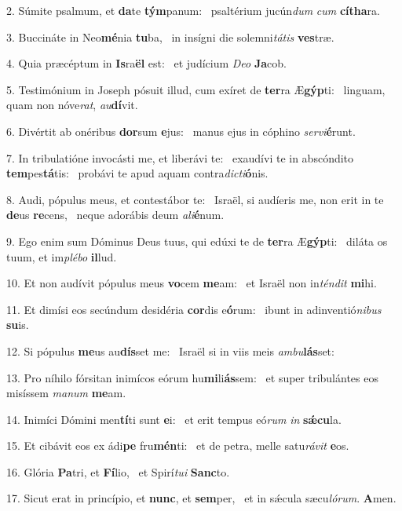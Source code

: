 2. Súmite psalmum, et \textbf{da}te \textbf{tým}panum: \ast\  psaltérium jucún\textit{dum} \textit{cum} \textbf{cí}\textbf{tha}ra.\

3. Buccináte in Neo\textbf{mé}nia \textbf{tu}ba, \ast\  in insígni die solemni\textit{tá}\textit{tis} \textbf{ves}træ.\

4. Quia præcéptum in \textbf{Is}ra\textbf{ël} est: \ast\  et judícium \textit{De}\textit{o} \textbf{Ja}cob.\

5. Testimónium in Joseph pósuit illud, cum exíret de \textbf{ter}ra Æ\textbf{gýp}ti: \ast\  linguam, quam non nóve\textit{rat}, \textit{au}\textbf{dí}vit.\

6. Divértit ab onéribus \textbf{dor}sum \textbf{e}jus: \ast\  manus ejus in cóphino \textit{ser}\textit{vi}\textbf{é}runt.\

7. In tribulatióne invocásti me, et liberávi te: \dag\  exaudívi te in abscóndito \textbf{tem}pes\textbf{tá}tis: \ast\  probávi te apud aquam contra\textit{dic}\textit{ti}\textbf{ó}nis.\

8. Audi, pópulus meus, et contestábor te: \dag\  Israël, si audíeris me, non erit in te \textbf{de}us \textbf{re}cens, \ast\  neque adorábis deum \textit{a}\textit{li}\textbf{é}num.\

9. Ego enim sum Dóminus Deus tuus, qui edúxi te de \textbf{ter}ra Æ\textbf{gýp}ti: \ast\  diláta os tuum, et im\textit{plé}\textit{bo} \textbf{il}lud.\

10. Et non audívit pópulus meus \textbf{vo}cem \textbf{me}am: \ast\  et Israël non in\textit{tén}\textit{dit} \textbf{mi}hi.\

11. Et dimísi eos secúndum desidéria \textbf{cor}dis e\textbf{ó}rum: \ast\  ibunt in adinventió\textit{ni}\textit{bus} \textbf{su}is.\

12. Si pópulus \textbf{me}us au\textbf{dís}set me: \ast\  Israël si in viis meis \textit{am}\textit{bu}\textbf{lás}set:\

13. Pro níhilo fórsitan inimícos eórum hu\textbf{mi}li\textbf{ás}sem: \ast\  et super tribulántes eos misíssem \textit{ma}\textit{num} \textbf{me}am.\

14. Inimíci Dómini men\textbf{tí}ti sunt \textbf{e}i: \ast\  et erit tempus eó\textit{rum} \textit{in} \textbf{sǽ}\textbf{cu}la.\

15. Et cibávit eos ex ádi\textbf{pe} fru\textbf{mén}ti: \ast\  et de petra, melle satu\textit{rá}\textit{vit} \textbf{e}os.\

16. Glória \textbf{Pa}tri, et \textbf{Fí}lio, \ast\  et Spirí\textit{tu}\textit{i} \textbf{Sanc}to.\

17. Sicut erat in princípio, et \textbf{nunc}, et \textbf{sem}per, \ast\  et in sǽcula sæcu\textit{ló}\textit{rum}. \textbf{A}men.\

